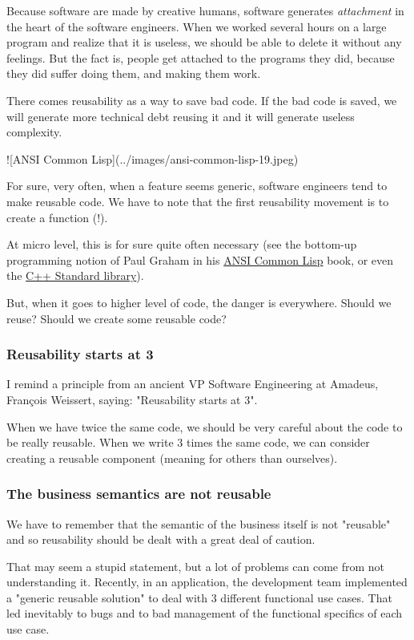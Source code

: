 \documentclass[]{article}
\begin{document}
Because software are made by creative humans, software generates \emph{attachment} in the heart of the software engineers. When we worked several hours on a large program and realize that it is useless, we should be able to delete it without any feelings. But the fact is, people get attached to the programs they did, because they did suffer doing them, and making them work.

There comes reusability as a way to save bad code. If the bad code is saved, we will generate more technical debt reusing it and it will generate useless complexity.

![ANSI Common Lisp](../images/ansi-common-lisp-19.jpeg)

For sure, very often, when a feature seems generic, software engineers tend to make reusable code. We have to note that the first reusability movement is to create a function (!).

At micro level, this is for sure quite often necessary (see the bottom-up programming notion of Paul Graham in his \href{https://paulgraham.com/acl.html}{ANSI Common Lisp} book, or even the \href{https://en.wikipedia.org/wiki/C%2B%2B_Standard_Library}{C++ Standard library}).

But, when it goes to higher level of code, the danger is everywhere. Should we reuse? Should we create some reusable code?

\subsubsection{Reusability starts at 3}

I remind a principle from an ancient VP Software Engineering at Amadeus, François Weissert, saying: "Reusability starts at 3".

When we have twice the same code, we should be very careful about the code to be really reusable. When we write 3 times the same code, we can consider creating a reusable component (meaning for others than ourselves).

\subsubsection{The business semantics are not reusable}

We have to remember that the semantic of the business itself is not "reusable" and so reusability should be dealt with a great deal of caution.

That may seem a stupid statement, but a lot of problems can come from not understanding it. Recently, in an application, the development team implemented a "generic reusable solution" to deal with 3 different functional use cases. That led inevitably to bugs and to bad management of the functional specifics of each use case.
\end{document}
